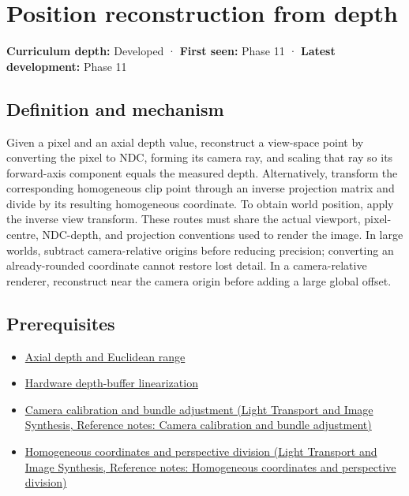 \hypertarget{appendix-2cbf2968e866}{}\label{referencestart:appendix-2cbf2968e866}
\section{Position reconstruction from depth}\label{appendix-2cbf2968e866-position-reconstruction-from-depth}

\textbf{Curriculum depth:} Developed · \textbf{First seen:} Phase 11 · \textbf{Latest development:} Phase 11

\subsection{Definition and mechanism}\label{appendix-2cbf2968e866-definition-and-mechanism}

Given a pixel and an axial depth value, reconstruct a view-space point by converting the pixel to NDC, forming its camera ray, and scaling that ray so its forward-axis component equals the measured depth. Alternatively, transform the corresponding homogeneous clip point through an inverse projection matrix and divide by its resulting homogeneous coordinate. To obtain world position, apply the inverse view transform. These routes must share the actual viewport, pixel-centre, NDC-depth, and projection conventions used to render the image. In large worlds, subtract camera-relative origins before reducing precision; converting an already-rounded coordinate cannot restore lost detail. In a camera-relative renderer, reconstruct near the camera origin before adding a large global offset.

\subsection{Prerequisites}\label{appendix-2cbf2968e866-prerequisites}

\begin{itemize}
\tightlist
\item
  \hyperref[appendix-cac01ebeeb11]{Axial depth and Euclidean range}
\item
  \hyperref[appendix-1bc40b08db4a]{Hardware depth-buffer linearization}
\item
  \href{../04-Light-Transport-and-Image-Synthesis/main.pdf\#nameddest=appendix-3ee9861904d5}{Camera calibration and bundle adjustment (Light Transport and Image Synthesis, Reference notes: Camera calibration and bundle adjustment)}
\item
  \href{../04-Light-Transport-and-Image-Synthesis/main.pdf\#nameddest=appendix-cb3b26862282}{Homogeneous coordinates and perspective division (Light Transport and Image Synthesis, Reference notes: Homogeneous coordinates and perspective division)}
\end{itemize}

